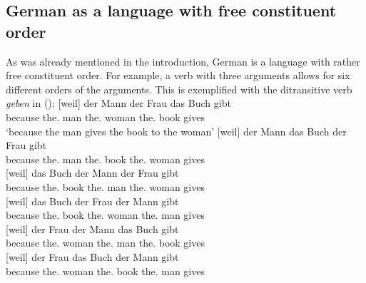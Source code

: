 \subsection{German as a language with free constituent order}
\label{sec-free-order-phen}

As was already mentioned in the introduction, German is a language with rather free constituent
order. For example, a verb with three arguments allows for six different orders of the
arguments. This is exemplified with the ditransitive verb \emph{geben} in ():
\eal
\label{ex-free-order}
\ex 
\gll {}[weil] der Mann der Frau das Buch gibt\\
     {}\spacebr{}because the.\nom{} man the.\dat{} woman the.\acc{} book gives\\
\glt `because the man gives the book to the woman'
\ex 
\gll {}[weil] der Mann das Buch der Frau gibt\\
     {}\spacebr{}because the.\nom{} man the.\acc{} book the.\dat{} woman gives\\
\ex 
\gll {}[weil] das Buch der Mann der Frau gibt\\
{}\spacebr{}because the.\acc{} book the.\nom{} man the.\dat{} woman gives\\
\ex 
\gll {}[weil] das Buch der Frau der Mann gibt\\
{}\spacebr{}because the.\acc{} book the.\dat{} woman the.\nom{} man gives\\
\ex 
\gll {}[weil] der Frau der Mann das Buch gibt\\
{}\spacebr{}because the.\dat{} woman the.\nom{} man the.\acc{} book gives\\
\ex 
\gll {}[weil] der Frau das Buch der Mann gibt\\
{}\spacebr{}because the.\dat{} woman the.\acc{} book the.\nom{} man gives\\
\zl

